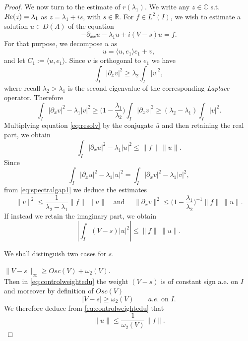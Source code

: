 \documentclass[10pt,a4paper]{amsart}
\newcommand{\C}{\mathbb{C}}
\newcommand{\R}{\mathbb{R}}
\begin{document}
\begin{proof}
We now turn to the estimate of $r(\lambda_1).$ We write any 
$z \in \C$ s.t. ${\rm Re}(z) = \lambda_1$  as 
$z = \lambda_1 + is$, with $s \in \R.$ For $f \in L^2(I)$, 
we wish to estimate a solution $u \in D(A)$ of the equation 
\begin{equation}\label{eq:resolv}
-\partial_{xx}u - \lambda_1 u + i(V - s)u = f.
\end{equation}
For that purpose, we decompose $u$ as 
\begin{equation}\label{eq:decomp-u}
    u = \langle u, e_1\rangle e_1 + v,
\end{equation} and let $C_1 := \langle u, e_1 \rangle.$ Since $v$ is orthogonal to $e_1$ we have
\begin{equation}\label{eq:lambda2}
\int_I |\partial_x v|^2 \geq \lambda_2 \int_I |v|^2,
\end{equation}
where recall $\lambda_2>\lambda_1$ is the second eigenvalue of the corresponding 
\textit{Laplace} operator. Therefore
\begin{equation}\label{eq:spectralgap1}
\int_I |\partial_x v|^2 - \lambda_1 |v|^2 \geq \big(1 -
\frac{\lambda_1}{\lambda_2}\big)
\int_I |\partial_x v|^2 \geq (\lambda_2 - \lambda_1) \int_I
|v|^2.
\end{equation}
Multiplying equation \eqref{eq:resolv} by the conjugate $\bar u$ and then retaining the real
part, we obtain 
$$
\int_I |\partial_x u|^2 - \lambda_1 |u|^2 \leq \|f\|\: \|u\|. 
$$
Since 
$$
\int_I |\partial_x u|^2 - \lambda_1 |u|^2 = \int_I |\partial_x v|^2 - \lambda_1
|v|^2,
$$
from \eqref{eq:spectralgap1} we deduce the estimates
\begin{equation}\label{eq:controlv}
	\|v\|^2 \leq \frac{1}{\lambda_2 - \lambda_1}\|f\|\: \|u\|\quad \text{
	and } \quad
	\|\partial_x v\|^2 \leq \big(1 - \frac{\lambda_1}{\lambda_2}\big)^{-1}
\|f\|\: \|u\|.
\end{equation}
If instead we retain the imaginary part, we obtain
\begin{equation}\label{eq:controlweightedu}
\left| \int_I (V - s) |u|^2 \right| \leq \|f\|\: \|u\|.
\end{equation}

We shall distinguish two cases for $s$.

\smallskip

 $\|V - s\|_\infty \geq Osc(V) + \omega_2(V).$\\
Then in \eqref{eq:controlweightedu} the 
weight $(V - s)$ is of constant sign a.e. on $I$ and moreover 
by definition of $Osc(V)$ 
$$
|V - s| \geq \omega_2(V) \qquad a.e. \text{ on } I.
$$
We therefore deduce from \eqref{eq:controlweightedu} that
\begin{equation}\label{eq:case1}
\|u \| \leq \frac{1}{\omega_2(V)} \|f\|.
\end{equation}


\end{proof}
\end{document}
